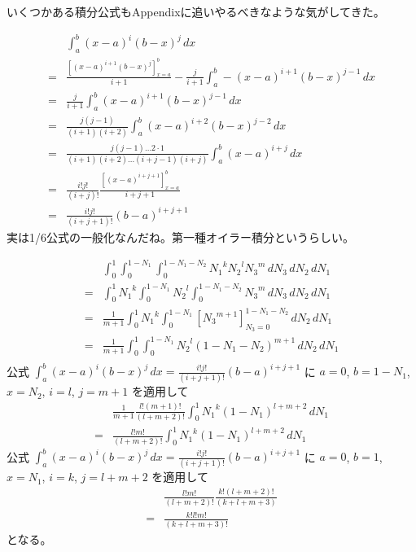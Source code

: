 いくつかある積分公式もAppendixに追いやるべきなような気がしてきた。

\begin{align}
&\int_a^b\left(x-a\right)^i\left(b-x\right)^j\,dx\\
=&\frac{\left[\left(x-a\right)^{i+1}\left(b-x\right)^j\right]_{x=a}^{b}}{i+1}
 - \frac{j}{i+1}\int_a^b-\left(x-a\right)^{i+1}\left(b-x\right)^{j-1}\,dx\\
=&\frac{j}{i+1}\int_a^b\left(x-a\right)^{i+1}\left(b-x\right)^{j-1}\,dx\\
=&\frac{j\left(j-1\right)}{\left(i+1\right)\left(i+2\right)}
  \int_a^b\left(x-a\right)^{i+2}\left(b-x\right)^{j-2}\,dx\\
=&\frac{j\left(j-1\right)\ldots2\cdot1}
       {\left(i+1\right)\left(i+2\right)
        \ldots\left(i+j-1\right)\left(i+j\right)}
  \int_a^b\left(x-a\right)^{i+j}\,dx\\
=&\frac{i!j!}{\left(i+j\right)!}
  \frac{\left[\left(x-a\right)^{i+j+1}\right]_{x=a}^b}
       {i+j+1}\\
=&\frac{i!j!}{\left(i+j+1\right)!}\left(b-a\right)^{i+j+1}
\end{align}
実は1/6公式の一般化なんだね。第一種オイラー積分というらしい。

\begin{align}
&\int_0^1\int_0^{1-N_1}\int_0^{1-N_1-N_2}
{N_1}^k{N_2}^l{N_3}^m
\,dN_3\,dN_2\,dN_1\\
=&
\int_0^1{N_1}^k\int_0^{1-N_1}{N_2}^l\int_0^{1-N_1-N_2}{N_3}^m
\,dN_3\,dN_2\,dN_1\\
=&
\frac{1}{m+1}
\int_0^1{N_1}^k\int_0^{1-N_1}
\left[{N_3}^{m+1}\right]_{N_3=0}^{1-N_1-N_2}
\,dN_2\,dN_1\\
=&\frac{1}{m+1}
\int_0^1\int_0^{1-N_1}
{N_2}^l\left(1-N_1-N_2\right)^{m+1}
\,dN_2\,dN_1\\
\end{align}
公式
$\displaystyle\int_a^b\left(x-a\right)^i\left(b-x\right)^j\,dx
=\frac{i!j!}{\left(i+j+1\right)!}\left(b-a\right)^{i+j+1}$
に
$a=0$, $b=1-N_1$, $x=N_2$, $i=l$, $j=m+1$
を適用して
\begin{align}
&\frac{1}{m+1}\frac{l!\left(m+1\right)!}{\left(l+m+2\right)!}
\int_0^1{N_1}^k
\left(1-N_1\right)^{l+m+2}
\,dN_1\\
=&\frac{l!m!}{\left(l+m+2\right)!}
\int_0^1{N_1}^k
\left(1-N_1\right)^{l+m+2}
\,dN_1
\end{align}
公式
$\displaystyle\int_a^b\left(x-a\right)^i\left(b-x\right)^j\,dx
=\frac{i!j!}{\left(i+j+1\right)!}\left(b-a\right)^{i+j+1}$
に
$a=0$, $b=1$, $x=N_1$, $i=k$, $j=l+m+2$
を適用して
\begin{align}
&\frac{l!m!}{\left(l+m+2\right)!}
\frac{k!\left(l+m+2\right)!}
     {\left(k+l+m+3\right)}\\
=&\frac{k!l!m!}{\left(k+l+m+3\right)!}
\end{align}
となる。